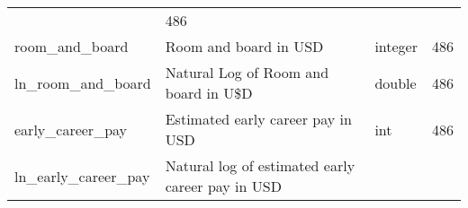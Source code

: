 \documentclass[
]{article}
\begin{document}
\begin{longtable}[]{@{}llll@{}}
\begin{minipage}[t]{0.18\columnwidth}
\end{minipage} & \begin{minipage}[t]{0.23\columnwidth}\raggedright
486\strut
\end{minipage}\tabularnewline
\begin{minipage}[t]{0.19\columnwidth}\raggedright
room\_and\_board\strut
\end{minipage} & \begin{minipage}[t]{0.28\columnwidth}\raggedright
Room and board in USD\strut
\end{minipage} & \begin{minipage}[t]{0.18\columnwidth}\raggedright
integer\strut
\end{minipage} & \begin{minipage}[t]{0.23\columnwidth}\raggedright
486\strut
\end{minipage}\tabularnewline
\begin{minipage}[t]{0.19\columnwidth}\raggedright
ln\_room\_and\_board\strut
\end{minipage} & \begin{minipage}[t]{0.28\columnwidth}\raggedright
Natural Log of Room and board in U\$D\strut
\end{minipage} & \begin{minipage}[t]{0.18\columnwidth}\raggedright
double\strut
\end{minipage} & \begin{minipage}[t]{0.23\columnwidth}\raggedright
486\strut
\end{minipage}\tabularnewline
\begin{minipage}[t]{0.19\columnwidth}\raggedright
early\_career\_pay\strut
\end{minipage} & \begin{minipage}[t]{0.28\columnwidth}\raggedright
Estimated early career pay in USD\strut
\end{minipage} & \begin{minipage}[t]{0.18\columnwidth}\raggedright
int\strut
\end{minipage} & \begin{minipage}[t]{0.23\columnwidth}\raggedright
486\strut
\end{minipage}\tabularnewline
\begin{minipage}[t]{0.19\columnwidth}\raggedright
ln\_early\_career\_pay\strut
\end{minipage} & \begin{minipage}[t]{0.28\columnwidth}\raggedright
Natural log of estimated early career pay in USD\strut

\end{minipage}
\end{longtable}
\end{document}
